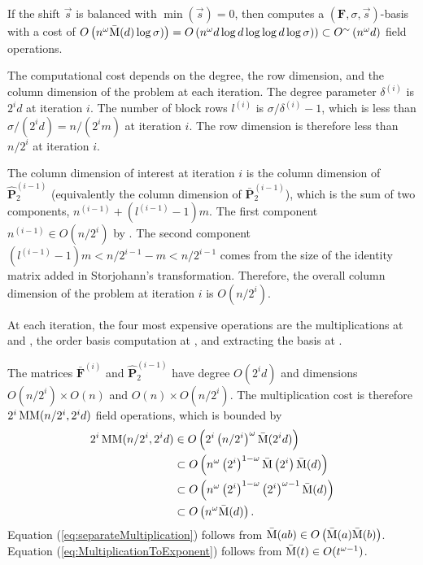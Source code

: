 \begin{thm}
\label{thm:balancedCost}If the shift $\vec{s}$ is balanced with
$\min\left(\vec{s}\right)=0$, then  computes
a $\left(\mathbf{F},\sigma,\vec{s}\right)$-basis with a cost of $O\left(n^{\omega}\bar{\M}(d)\log\sigma)\right)=O\left(n^{\omega}d\log d\log\log d\log\sigma)\right)\subset O^{\sim}\left(n^{\omega}d\right)$
field operations. \end{thm}
\begin{pf}
The computational cost depends on the degree, the row dimension, and
the column dimension of the problem at each iteration. The degree
parameter $\delta^{\left(i\right)}$ is $2^{i}d$ at iteration $i$.
The number of block rows $l^{\left(i\right)}$ is $\sigma/\delta^{\left(i\right)}-1$,
which is less than $\sigma/(2^{i}d)=n/(2^{i}m)$ at iteration $i$.
The row dimension is therefore less than $n/2^{i}$ at iteration $i$.

The column dimension of interest at iteration $i$ is the column dimension
of $\hat{\mathbf{P}}_{2}^{\left(i-1\right)}$ (equivalently the column
dimension of $\bar{\mathbf{P}}_{2}^{\left(i-1\right)}$), which is
the sum of two components, $n^{\left(i-1\right)}+(l^{\left(i-1\right)}-1)m$.
The first component $n^{\left(i-1\right)}\in O(n/2^{i})$ by .
The second component $(l^{\left(i-1\right)}-1)m<n/2^{i-1}-m<n/2^{i-1}$
comes from the size of the identity matrix added in Storjohann's transformation.
Therefore, the overall column dimension of the problem at iteration
$i$ is $O(n/2^{i})$.

At each iteration, the four most expensive operations are the multiplications
at  and ,
the order basis computation at ,
and extracting the basis at .

The matrices $\bar{\mathbf{F}}^{\left(i\right)}$ and $\hat{\mathbf{P}}_{2}^{\left(i-1\right)}$
have degree $O(2^{i}d)$ and dimensions $O(n/2^{i})\times O\left(n\right)$
and $O\left(n\right)\times O(n/2^{i})$. The multiplication cost is
therefore $2^{i}\MM(n/2^{i},2^{i}d)$ field operations, which is bounded
by\begin{align}
2^{i}\MM(n/2^{i},2^{i}d) & \in O\left(2^{i}\left(n/2^{i}\right)^{\omega}\bar{\M}(2^{i}d)\right)\nonumber \\
 & \subset O\left(n^{\omega}\left(2^{i}\right)^{1-\omega}\bar{\M}\left(2^{i}\right)\bar{\M}(d)\right)\label{eq:separateMultiplication}\\
 & \subset O\left(n^{\omega}\left(2^{i}\right)^{1-\omega}\left(2^{i}\right)^{\omega-1}\bar{\M}(d)\right)\label{eq:MultiplicationToExponent}\\
 & \subset O\left(n^{\omega}\bar{\M}(d)\right).\nonumber \end{align}
Equation (\ref{eq:separateMultiplication}) follows from $\bar{\M}(ab)\in O\left(\bar{\M}(a)\bar{\M}(b)\right)$.
Equation (\ref{eq:MultiplicationToExponent}) follows from $\bar{\M}(t)\in O(t^{\omega-1})$.


\end{pf}
